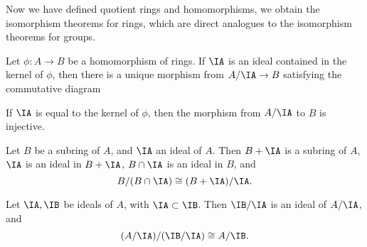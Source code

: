 
Now we have defined quotient rings and homomorphisms, we obtain the isomorphism theorems for rings, which are direct analogues to the isomorphism theorems for groups.

\begin{theorem}
    Let $\phi: A \to B$ be a homomorphism of rings. If $\IA$ is an ideal contained in the kernel of $\phi$, then there is a unique morphism from $A/\IA \to B$ satisfying the commutative diagram
    \begin{center}
    \end{center}
    If $\IA$ is equal to the kernel of $\phi$, then the morphism from $A/\IA$ to $B$ is injective.
\end{theorem}

\begin{theorem}
    Let $B$ be a subring of $A$, and $\IA$ an ideal of $A$. Then $B + \IA$ is a subring of $A$, $\IA$ is an ideal in $B + \IA$, $B \cap \IA$ is an ideal in $B$, and
    \[ B/(B \cap \IA) \cong (B + \IA)/\IA. \]
\end{theorem}

\begin{theorem}
    Let $\IA, \IB$ be ideals of $A$, with $\IA \subset \IB$. Then $\IB/\IA$ is an ideal of $A/\IA$, and
    \[ (A/\IA)/(\IB/\IA) \cong A/\IB. \]
\end{theorem}

